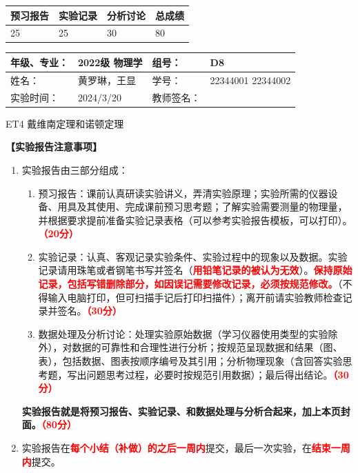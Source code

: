 \documentclass[dvipsnames, svgnames,a4paper,11pt]{article}
\begin{document}
	
	\begin{table}
		\renewcommand\arraystretch{1.7}
		\begin{tabularx}{\textwidth}{
				|X|X|X|X
				|X|X|X|X|}
			\hline
			\multicolumn{2}{|c|}{预习报告}&\multicolumn{2}{|c|}{实验记录}&\multicolumn{2}{|c|}{分析讨论}&\multicolumn{2}{|c|}{总成绩}\\
			\hline
			\LARGE25 & & \LARGE25 & & \LARGE30 & & \LARGE80 & \\
			\hline
		\end{tabularx}
	\end{table}
	
		\begin{table}
		\renewcommand\arraystretch{1.7}
		\begin{tabularx}{\textwidth}{|X|X|X|X|}
			\hline
			年级、专业： & 2022级 物理学 &组号： &D8 \\
			\hline
			姓名： &  黄罗琳，王显  & 学号： &22344001 22344002   \\
			\hline
			实验时间： & 2024/3/20 & 教师签名： & \\
			\hline
		\end{tabularx}
	\end{table}
	
	\begin{center}
	\LARGE ET4 \quad 戴维南定理和诺顿定理
	\end{center}
	
	
	\textbf{【实验报告注意事项】}
	\begin{enumerate}
		\item 实验报告由三部分组成：
		\begin{enumerate}
			\item 预习报告：课前认真研读实验讲义，弄清实验原理；实验所需的仪器设备、用具及其使用、完成课前预习思考题；了解实验需要测量的物理量，并根据要求提前准备实验记录表格（可以参考实验报告模板，可以打印）。\textcolor{red}{\textbf{（20分）}}
			\item 实验记录：认真、客观记录实验条件、实验过程中的现象以及数据。实验记录请用珠笔或者钢笔书写并签名（\textcolor{red}{\textbf{用铅笔记录的被认为无效}}）。\textcolor{red}{\textbf{保持原始记录，包括写错删除部分，如因误记需要修改记录，必须按规范修改。}}（不得输入电脑打印，但可扫描手记后打印扫描件）；离开前请实验教师检查记录并签名。\textcolor{red}{\textbf{（30分）}}
			\item 数据处理及分析讨论：处理实验原始数据（学习仪器使用类型的实验除外），对数据的可靠性和合理性进行分析；按规范呈现数据和结果（图、表），包括数据、图表按顺序编号及其引用；分析物理现象（含回答实验思考题，写出问题思考过程，必要时按规范引用数据）；最后得出结论。\textcolor{red}{\textbf{（30分）}}
		\end{enumerate}
		\textbf{实验报告就是将预习报告、实验记录、和数据处理与分析合起来，加上本页封面。\textcolor{red}{（80分）}}
		\item 实验报告在\textcolor{red}{\textbf{每个小结（补做）的之后一周内}}提交，最后一次实验，在\textcolor{red}{\textbf{结束一周内}}提交。
		
	\end{enumerate}
	
\end{document}
